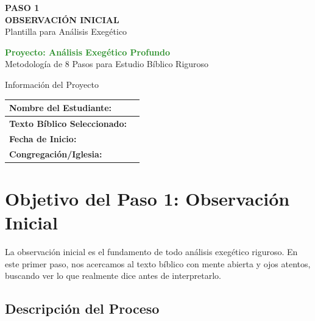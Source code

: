 \documentclass[11pt,a4paper]{article}
\begin{document}
\begin{center}
    {\Huge\color{forestgreen}\textbf{PASO 1}}\\[0.5cm]
    {\Large\color{sagegreen}\textbf{OBSERVACIÓN INICIAL}}\\[0.3cm]
    {\large\color{papergray}Plantilla para Análisis Exegético}\\[1cm]
    
    \begin{tcolorbox}[colback=olivegreen!10, colframe=olivegreen, width=0.8\textwidth]
        \centering
        \textcolor{forestgreen}{\textbf{Proyecto: Análisis Exegético Profundo}}\\
        \textcolor{papergray}{Metodología de 8 Pasos para Estudio Bíblico Riguroso}
    \end{tcolorbox}
\end{center}

\vspace{1cm}

\begin{infobox}{Información del Proyecto}
\begin{tabularx}{\textwidth}{|X|X|}
\hline
\textbf{Nombre del Estudiante:} & \underline{\hspace{6cm}} \\[0.8cm]
\hline
\textbf{Texto Bíblico Seleccionado:} & \underline{\hspace{6cm}} \\[0.8cm]
\hline
\textbf{Fecha de Inicio:} & \underline{\hspace{6cm}} \\[0.8cm]
\hline
\textbf{Congregación/Iglesia:} & \underline{\hspace{6cm}} \\[0.8cm]
\hline
\end{tabularx}
\end{infobox}

\section{Objetivo del Paso 1: Observación Inicial}

La observación inicial es el fundamento de todo análisis exegético riguroso. En este primer paso, nos acercamos al texto bíblico con mente abierta y ojos atentos, buscando ver lo que realmente dice antes de interpretarlo.

\subsection{Descripción del Proceso}
\end{document}
